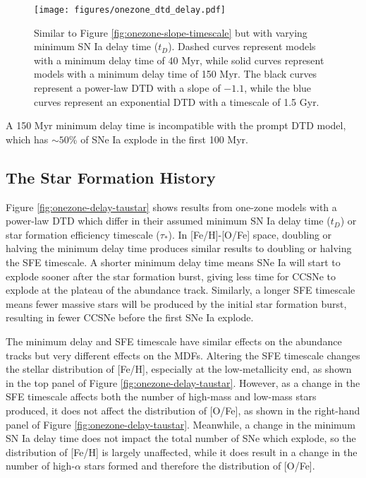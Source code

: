\documentclass[twocolumn,linenumbers,twocolappendix]{aastex631}
\begin{document}
\begin{figure}
    \centering
    \texttt{[image: figures/onezone\_dtd\_delay.pdf]}
    \caption{Similar to Figure \ref{fig:onezone-slope-timescale} but with varying minimum SN Ia delay time ($t_D$). Dashed curves represent models with a minimum delay time of 40 Myr, while solid curves represent models with a minimum delay time of 150 Myr. The black curves represent a power-law DTD with a slope of $-1.1$, while the blue curves represent an exponential DTD with a timescale of 1.5 Gyr.}
    \label{fig:onezone-dtd-delay}
\end{figure}

A 150 Myr minimum delay time is incompatible with the prompt DTD model, which has $\sim 50$\% of SNe Ia explode in the first 100 Myr.

\subsection{The Star Formation History}

Figure \ref{fig:onezone-delay-taustar} shows results from one-zone models with a power-law DTD which differ in their assumed minimum SN Ia delay time ($t_D$) or star formation efficiency timescale ($\tau_*$). In [Fe/H]-[O/Fe] space, doubling or halving the minimum delay time produces similar results to doubling or halving the SFE timescale. A shorter minimum delay time means SNe Ia will start to explode sooner after the star formation burst, giving less time for CCSNe to explode at the plateau of the abundance track. Similarly, a longer SFE timescale means fewer massive stars will be produced by the initial star formation burst, resulting in fewer CCSNe before the first SNe Ia explode. 

The minimum delay and SFE timescale have similar effects on the abundance tracks but very different effects on the MDFs. Altering the SFE timescale changes the stellar distribution of [Fe/H], especially at the low-metallicity end, as shown in the top panel of Figure \ref{fig:onezone-delay-taustar}. However, as a change in the SFE timescale affects both the number of high-mass and low-mass stars produced, it does not affect the distribution of [O/Fe], as shown in the right-hand panel of Figure \ref{fig:onezone-delay-taustar}. Meanwhile, a change in the minimum SN Ia delay time does not impact the total number of SNe which explode, so the distribution of [Fe/H] is largely unaffected, while it does result in a change in the number of high-$\alpha$ stars formed and therefore the distribution of [O/Fe].
\end{document}
